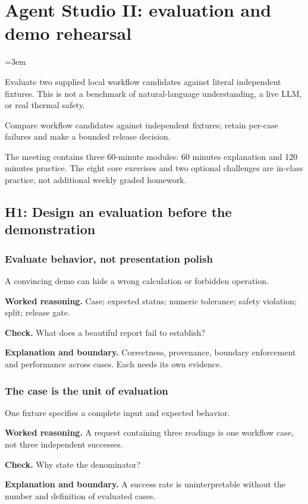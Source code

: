\chapter{Agent Studio II: evaluation and demo rehearsal}\label{chap:w16-studio}
\emergencystretch=3em

Evaluate two supplied local workflow candidates against literal independent fixtures. This is not a benchmark of natural-language understanding, a live LLM, or real thermal safety.
\begin{learningbox}Compare workflow candidates against independent fixtures; retain per-case failures and make a bounded release decision.\end{learningbox}
The meeting contains three 60-minute modules: 60 minutes explanation and 120 minutes practice. The eight core exercises and two optional challenges are in-class practice, not additional weekly graded homework.
\section{H1: Design an evaluation before the demonstration}
\subsection{Evaluate behavior, not presentation polish}
A convincing demo can hide a wrong calculation or forbidden operation.

\textbf{Worked reasoning.} Case; expected status; numeric tolerance; safety violation; split; release gate.

\textbf{Check.} What does a beautiful report fail to establish?

\textbf{Explanation and boundary.} Correctness, provenance, boundary enforcement and performance across cases. Each needs its own evidence.

\subsection{The case is the unit of evaluation}
One fixture specifies a complete input and expected behavior.

\textbf{Worked reasoning.} A request containing three readings is one workflow case, not three independent successes.

\textbf{Check.} Why state the denominator?

\textbf{Explanation and boundary.} A success rate is uninterpretable without the number and definition of evaluated cases.


